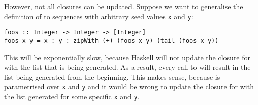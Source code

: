However, not all closures can be updated. Suppose we want to generalise the definition of  to sequences with arbitrary seed values \texttt{\small x} and \texttt{\small y}:
\begin{verbatim}
foos :: Integer -> Integer -> [Integer]
foos x y = x : y : zipWith (+) (foos x y) (tail (foos x y))
\end{verbatim}
This will be exponentially slow, because Haskell will not update the closure for  with the list that is being generated. As a result, every call to  will result in the list being generated from the beginning. This makes sense, because  is parametrised over \texttt{\small x} and \texttt{\small y} and it would be wrong to update the closure for  with the list generated for some specific \texttt{\small x} and \texttt{\small y}. 

\taskLine



\taskLine